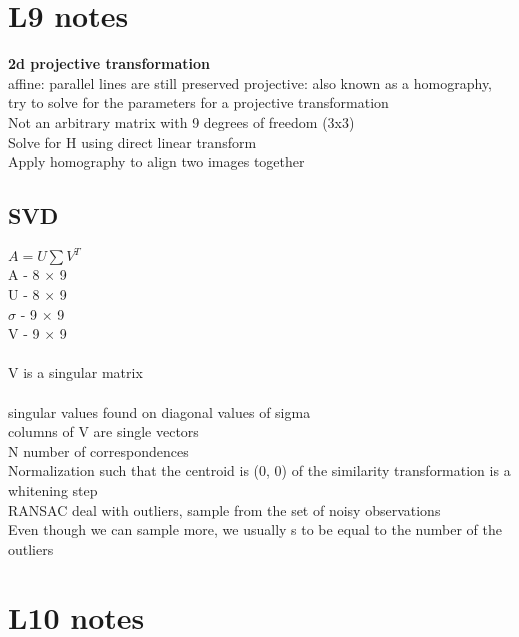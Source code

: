 \documentclass[11pt]{article}
\begin{document}
\section*{L9 notes}
\textbf{2d projective transformation}\\
affine: parallel lines are still preserved
projective: also known as a homography, try to solve for the parameters for  a projective transformation\\
Not an arbitrary matrix with 9 degrees of freedom (3x3)\\
Solve for H using direct linear transform
\\
Apply homography to align two images together
\subsection*{SVD}
$A = U \sum V^{T}$\\
A - 8 $\times$ 9\\
U - 8 $\times$ 9\\
$\sigma$ - 9 $\times$ 9\\
V - 9 $\times$ 9\\
\\
V is a singular matrix\\\\
singular values found on diagonal values of sigma\\
columns of V are single vectors
\\
N number of correspondences
\\ 
Normalization such that the centroid is (0, 0) of the similarity transformation is a whitening step
\\
RANSAC deal with outliers, sample from the set of noisy observations
\\
Even though we can sample more, we usually s to be equal to the number of the outliers
\section*{L10 notes}
\end{document}
